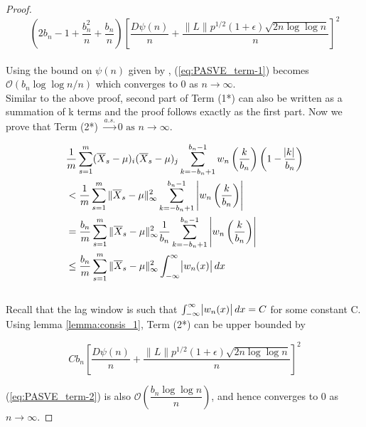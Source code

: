 \documentclass[12pt]{article}
\begin{document}
\begin{proof}
\begin{equation} \label{eq:PASVE_term-1}
  \left(2b_n - 1 + \dfrac{b_n^2}{n} + \dfrac{b_n}{n}\right)\left[ \dfrac{D \psi(n)}{n} + \dfrac{\|L\| p^{1/2}(1+\epsilon)\sqrt{2n \log\log n}}{n}  \right]^2  
\end{equation}
\\
Using the bound on $\psi(n)$ given by \cite{stra:1964}, (\ref{eq:PASVE_term-1}) becomes $\mathcal{O}\left(b_n \log \log n/n\right)$ which converges to 0 as $n \to \infty$.
\\
Similar to the above proof, second part of Term (1*) can also be written as a summation of k terms and the proof follows exactly as the first part. Now we prove that Term (2*) $\xrightarrow{a.s.} 0 \textrm{ as } n \to \infty$.

\begin{align*}
    &\dfrac{1}{m}\sum\limits_{s=1}^{m}(\overline{X}_s - \mu)_i(\overline{X}_s - \mu)_j\sum\limits_{k=-b_n+1}^{b_n-1}w_n\left(\dfrac{k}{b_n}\right)\left(1 - \dfrac{\abs{k}}{b_n}\right)\\
    & < \dfrac{1}{m}\sum\limits_{s=1}^{m} \|\overline{X}_s - \mu\|_{\infty}^2 \sum\limits_{k=-b_n+1}^{b_n-1}\left|w_n\left(\dfrac{k}{b_n}\right)\right|\\
    & = \dfrac{b_n}{m}\sum\limits_{s=1}^{m} \|\overline{X}_s - \mu\|_{\infty}^2 \dfrac{1}{b_n} \sum\limits_{k=-b_n+1}^{b_n-1}\left|w_n\left(\dfrac{k}{b_n}\right)\right|\\
    & \leq \dfrac{b_n}{m}\sum\limits_{s=1}^{m} \|\overline{X}_s - \mu\|_{\infty}^2 \int_{-\infty}^{\infty} \abs{w_n(x)}dx
\end{align*}
\\
Recall that the lag window is such that $\int_{-\infty}^{\infty} \abs{w_n(x)}dx = C$ for some constant C. Using lemma \ref{lemma:consis_1}, Term (2*) can be upper bounded by

\begin{equation} \label{eq:PASVE_term-2}
    Cb_n\left[ \dfrac{D \psi(n)}{n} + \dfrac{\|L\| p^{1/2}(1+\epsilon)\sqrt{2n \log\log n}}{n}  \right]^2 
\end{equation}

(\ref{eq:PASVE_term-2}) is also $\mathcal{O}\left(\dfrac{b_n \log \log n}{n}\right)$, and hence converges to 0 as $n \to \infty$.

\end{proof}



\bigskip
\end{document}
